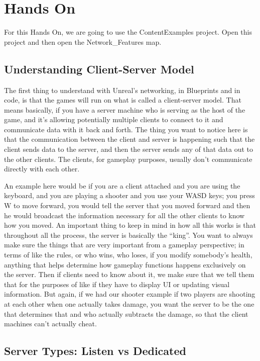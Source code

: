 \documentclass[
  letterpaper,
  DIV=11,
  numbers=noendperiod]{scrartcl}
\begin{document}
\section{Hands On}\label{hands-on}

For this Hands On, we are going to use the ContentExamples project. Open
this project and then open the Network\_Features map.

\subsection{Understanding Client-Server
Model}\label{understanding-client-server-model}

The first thing to understand with Unreal's networking, in Blueprints
and in code, is that the games will run on what is called a
client-server model. That means basically, if you have a server machine
who is serving as the host of the game, and it's allowing potentially
multiple clients to connect to it and communicate data with it back and
forth. The thing you want to notice here is that the communication
between the client and server is happening such that the client sends
data to the server, and then the server sends any of that data out to
the other clients. The clients, for gameplay purposes, usually don't
communicate directly with each other.

An example here would be if you are a client attached and you are using
the keyboard, and you are playing a shooter and you use your WASD keys;
you press W to move forward, you would tell the server that you moved
forward and then he would broadcast the information necessary for all
the other clients to know how you moved. An important thing to keep in
mind in how all this works is that throughout all the process, the
server is basically the ``king''. You want to always make sure the
things that are very important from a gameplay perspective; in terms of
like the rules, or who wins, who loses, if you modify somebody's health,
anything that helps determine how gameplay functions happens exclusively
on the server. Then if clients need to know about it, we make sure that
we tell them that for the purposes of like if they have to display UI or
updating visual information. But again, if we had our shooter example if
two players are shooting at each other when one actually takes damage,
you want the server to be the one that determines that and who actually
subtracts the damage, so that the client machines can't actually cheat.

\subsection{Server Types: Listen vs
Dedicated}\label{server-types-listen-vs-dedicated}
\end{document}

